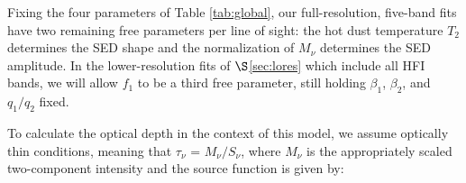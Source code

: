 \documentclass{emulateapj}
\newcommand{\PLANCK}{{\it Planck}}
\begin{document}


Fixing the four parameters of Table \ref{tab:global}, our full-resolution, 
five-band fits have two remaining free parameters per line of sight: the hot 
dust temperature $T_2$ determines the SED shape and the normalization of 
$M_{\nu}$ determines the SED amplitude. In the lower-resolution fits of 
$\S$\ref{sec:lores} which include all HFI bands, we will allow $f_1$ to be a 
third free parameter, still holding $\beta_1$, $\beta_2$, and $q_1/q_2$ fixed.


% 






To calculate the optical depth in the context of this model, we assume
optically thin conditions, meaning that $\tau_{\nu}$ = $M_{\nu}/S_{\nu}$, where
$M_{\nu}$ is the appropriately scaled two-component intensity and the source
function is given by:
\end{document}
